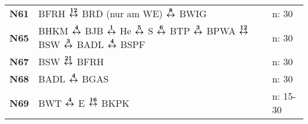 \begin{minipage}[t]{0.45\textwidth}
\begin{tabular}{>{\bfseries}L{1.2cm}L{9.0cm}L{3.0cm}}
\nbus{} N61   & BFRH $\boldsymbol{\overset{12}{\leftrightarrow}}$ BRD (nur am WE) $\boldsymbol{\overset{8}{\leftrightarrow}}$ BWIG                                                                                                                  & n: 30                      \\
\nbus{} N65   & BHKM $\boldsymbol{\overset{4}{\leftrightarrow}}$ BJB $\boldsymbol{\overset{1}{\leftrightarrow}}$ He $\boldsymbol{\overset{5}{\leftrightarrow}}$ S $\boldsymbol{\overset{6}{\leftrightarrow}}$ BTP $\boldsymbol{\overset{3}{\leftrightarrow}}$ BPWA $\boldsymbol{\overset{12}{\leftrightarrow}}$ BSW $\boldsymbol{\overset{3}{\leftrightarrow}}$ BADL $\boldsymbol{\overset{4}{\leftrightarrow}}$ BSPF                               & n: 30                      \\
\nbus{} N67   & BSW $\boldsymbol{\overset{21}{\leftrightarrow}}$ BFRH                                                                                                                                               & n: 30                      \\
\nbus{} N68   & BADL $\boldsymbol{\overset{4}{\leftrightarrow}}$ BGAS                                                                                                                                               & n: 30                      \\
\nbus{} N69   & BWT $\boldsymbol{\overset{4}{\leftrightarrow}}$ E $\boldsymbol{\overset{16}{\leftrightarrow}}$ BKPK                                                                                                                                 & n: 15-30                   \\
\hline
\end{tabular}
\end{minipage}
\begin{minipage}[t]{0.05\textwidth}
\phantom{Tor}
\end{minipage}


